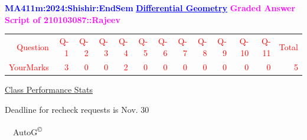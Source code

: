 \documentclass{article}                              %
\begin{document}
%
\vspace*{1in}

\begin{center}
	\textbf{\textcolor{blue}{\LARGE MA411m:2024:Shishir:EndSem}}
	\vskip 1cm
	\textbf{\textcolor{blue}{\underline{\Large Differential Geometry}}}
	\vskip 1cm
	\textbf{\textcolor{magenta}{\LARGE Graded Answer Script of 210103087::Rajeev}}
\end{center}


\begin{center}
	\Huge 
	\textcolor{red}{
	\begin{tabular}{*{13}{r}}
		Question&Q-1& Q-2& Q-3& Q-4& Q-5& Q-6& Q-7& Q-8& Q-9& Q-10& Q-11&Total  \\
        	YourMarks&3&0&0&2&0&0&0&0&0&0&0&5
	\end{tabular}
	}
        \vskip 2cm
	\large
	\underline{Class Performance Stats}
	\DTLsetseparator{;}
	\begin{table}[htbp]
		\centering
	\end{table}
	\vskip 1cm
	Deadline for recheck requests is Nov. 30
\end{center}
\ \vfill \ \hfill \small AutoG\textsuperscript{\copyright}
\newpage
%
\end{document}
